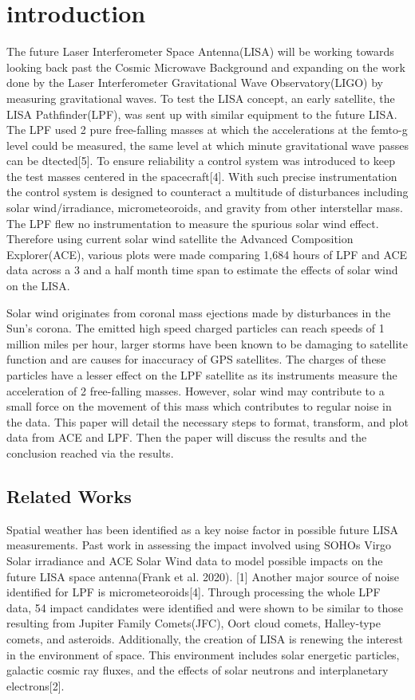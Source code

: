\documentclass[%
 reprint,
 amsmath,amssymb,
 aps,
]{revtex4-2}
\begin{document}
\section{introduction}
The future Laser Interferometer Space Antenna(LISA) will be working towards looking back past the Cosmic Microwave Background and expanding on the work done by the Laser Interferometer Gravitational Wave Observatory(LIGO) by measuring gravitational waves. To test the LISA concept, an early satellite, the LISA Pathfinder(LPF), was sent up with similar equipment to the future LISA.  The LPF used 2 pure free-falling masses at which the accelerations at the femto-g level could be measured, the same level at which minute gravitational wave passes can be dtected[5]. To ensure reliability a control system was introduced to keep the test masses centered in the spacecraft[4]. With such precise instrumentation the control system is designed to counteract a multitude of disturbances including solar wind/irradiance, micrometeoroids, and gravity from other interstellar mass. The LPF flew no instrumentation to measure the spurious solar wind effect. Therefore using current solar wind satellite the Advanced Composition Explorer(ACE), various plots were made comparing 1,684 hours of LPF and ACE data across a 3 and a half month time span to estimate the effects of solar wind on the LISA.

Solar wind originates from coronal mass ejections made by disturbances in the Sun’s corona. The emitted high speed charged particles can reach speeds of 1 million miles per hour, larger storms have been known to be damaging to satellite function and are causes for inaccuracy of GPS satellites. The charges of these particles have a lesser effect on the LPF satellite as its instruments measure the acceleration of 2 free-falling masses. However, solar wind may contribute to a small force on the movement of this mass which contributes to regular noise in the data. This paper will detail the necessary steps to format, transform, and plot data from ACE and LPF. Then the paper will discuss the results and the conclusion reached via the results.

\subsection{\label{sec:level2}Related Works}
Spatial weather has been identified as a key noise factor in possible future LISA measurements. Past work in assessing the impact involved using SOHOs Virgo Solar irradiance and ACE Solar Wind data to model possible impacts on the future LISA space antenna(Frank et al. 2020). [1] Another major source of noise identified for LPF is micrometeoroids[4]. Through processing the whole LPF data, 54 impact candidates were identified and were shown to be similar to those resulting from Jupiter Family Comets(JFC), Oort cloud comets, Halley-type comets, and asteroids. Additionally, the creation of LISA is renewing the interest in the environment of space. This environment includes solar energetic particles, galactic cosmic ray fluxes, and the effects of solar neutrons and interplanetary electrons[2].
\end{document}

